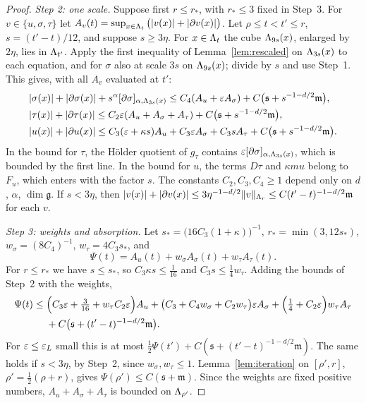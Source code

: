 \begin{proof}
\emph{Step 2: one scale.} Suppose first $r\le r_*$, with $r_*\le3$ fixed in Step~3. For $v\in\{u,\sigma,\tau\}$ let $A_v(t)=\sup_{x\in\Lambda_t}\big(|v(x)|+|\partial v(x)|\big)$. Let $\rho\le t<t'\le r$, $s=(t'-t)/12$, and suppose $s\ge3\eta$. For $x\in\Lambda_t$ the cube $\Lambda_{9s}(x)$, enlarged by $2\eta$, lies in $\Lambda_{t'}$. Apply the first inequality of Lemma~\ref{lem:rescaled} on $\Lambda_{3s}(x)$ to each equation, and for $\sigma$ also at scale $3s$ on $\Lambda_{9s}(x)$; divide by $s$ and use Step~1. This gives, with all $A_v$ evaluated at $t'$:
\begin{align*}
&|\sigma(x)|+|\partial\sigma(x)|+s^\alpha[\partial\sigma]_{\alpha,\Lambda_{3s}(x)}\le C_4(A_u+\varepsilon A_\sigma)+C\big(\mathfrak s+s^{-1-d/2}\mathfrak m\big),\\
&|\tau(x)|+|\partial\tau(x)|\le C_2\varepsilon(A_u+A_\sigma+A_\tau)+C\big(\mathfrak s+s^{-1-d/2}\mathfrak m\big),\\
&|u(x)|+|\partial u(x)|\le C_3(\varepsilon+\kappa s)A_u+C_3\varepsilon A_\sigma+C_3sA_\tau+C\big(\mathfrak s+s^{-1-d/2}\mathfrak m\big).
\end{align*}
In the bound for $\tau$, the H\"older quotient of $g_\tau$ contains $\varepsilon[\partial\sigma]_{\alpha,\Lambda_{3s}(x)}$, which is bounded by the first line. In the bound for $u$, the terms $D\tau$ and $\kappa mu$ belong to $F_u$, which enters with the factor $s$. The constants $C_2,C_3,C_4\ge1$ depend only on $d$, $\alpha$, $\dim\mathfrak g$. If $s<3\eta$, then $|v(x)|+|\partial v(x)|\le3\eta^{-1-d/2}\|v\|_{\Lambda_r}\le C(t'-t)^{-1-d/2}\mathfrak m$ for each $v$.

\emph{Step 3: weights and absorption.} Let $s_*=\big(16C_3(1+\kappa)\big)^{-1}$, $r_*=\min(3,12s_*)$, $w_\sigma=(8C_4)^{-1}$, $w_\tau=4C_3s_*$, and
\[
\Psi(t)=A_u(t)+w_\sigma A_\sigma(t)+w_\tau A_\tau(t).
\]
For $r\le r_*$ we have $s\le s_*$, so $C_3\kappa s\le\frac1{16}$ and $C_3s\le\frac14w_\tau$. Adding the bounds of Step~2 with the weights,
\[
\begin{aligned}
\Psi(t)\le{}&\Big(C_3\varepsilon+\tfrac3{16}+w_\tau C_2\varepsilon\Big)A_u+\big(C_3+C_4w_\sigma+C_2w_\tau\big)\varepsilon A_\sigma+\Big(\tfrac14+C_2\varepsilon\Big)w_\tau A_\tau\\
&+C\big(\mathfrak s+(t'-t)^{-1-d/2}\mathfrak m\big).
\end{aligned}
\]
For $\varepsilon\le\varepsilon_L$ small this is at most $\frac12\Psi(t')+C(\mathfrak s+(t'-t)^{-1-d/2}\mathfrak m)$. The same holds if $s<3\eta$, by Step~2, since $w_\sigma,w_\tau\le1$. Lemma~\ref{lem:iteration} on $[\rho',r]$, $\rho'=\frac12(\rho+r)$, gives $\Psi(\rho')\le C(\mathfrak s+\mathfrak m)$. Since the weights are fixed positive numbers, $A_u+A_\sigma+A_\tau$ is bounded on $\Lambda_{\rho'}$.


\end{proof}
